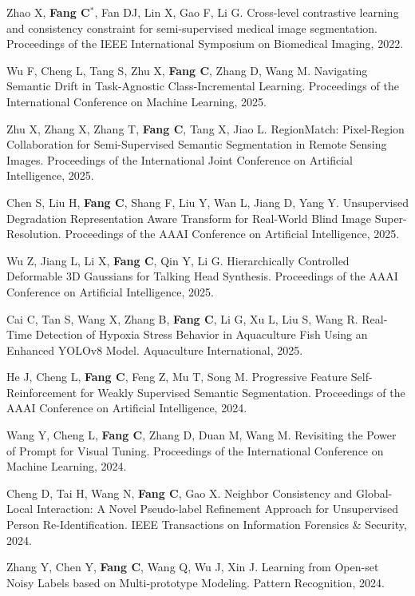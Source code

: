 \documentclass[a4paper,36pt]{article}
\newcommand{\tb}[1]{\textbf{#1}}
\newcommand{\resumeItemWithoutTitle}[1]{
  \item\justifying\small{
    {#1 \vspace{-2pt}}
  }
}
\begin{document}
\resumeItemWithoutTitle{Zhao X, \tb{Fang C}$^{\ast}$, Fan DJ, Lin X, Gao F, Li G. Cross-level contrastive learning and consistency constraint for semi-supervised medical image segmentation. Proceedings of the IEEE International Symposium on Biomedical Imaging, 2022.}

\resumeItemWithoutTitle{Wu F, Cheng L, Tang S, Zhu X, \tb{Fang C}, Zhang D, Wang M. Navigating Semantic Drift in Task-Agnostic Class-Incremental Learning. Proceedings of the International Conference on Machine Learning, 2025.}

\resumeItemWithoutTitle{Zhu X, Zhang X, Zhang T, \tb{Fang C}, Tang X, Jiao L. RegionMatch: Pixel-Region Collaboration for Semi-Supervised Semantic Segmentation in Remote Sensing Images. Proceedings of the International Joint Conference on Artificial Intelligence, 2025.}

\resumeItemWithoutTitle{Chen S, Liu H, \tb{Fang C}, Shang F, Liu Y, Wan L, Jiang D, Yang Y. Unsupervised Degradation Representation Aware Transform for Real-World Blind Image Super-Resolution. Proceedings of the AAAI Conference on Artificial Intelligence, 2025.}

\resumeItemWithoutTitle{Wu Z, Jiang L, Li X, \tb{Fang C}, Qin Y, Li G. Hierarchically Controlled Deformable 3D Gaussians for Talking Head Synthesis. Proceedings of the AAAI Conference on Artificial Intelligence, 2025.}

\resumeItemWithoutTitle{Cai C, Tan S, Wang X, Zhang B, \tb{Fang C}, Li G, Xu L, Liu S, Wang R. Real-Time Detection of Hypoxia Stress Behavior in Aquaculture Fish Using an Enhanced YOLOv8 Model. Aquaculture International, 2025.}

\resumeItemWithoutTitle{He J, Cheng L, \tb{Fang C}, Feng Z, Mu T, Song M. Progressive Feature Self-Reinforcement for Weakly Supervised Semantic Segmentation. Proceedings of the AAAI Conference on Artificial Intelligence, 2024. }

\resumeItemWithoutTitle{Wang Y, Cheng L, \tb{Fang C}, Zhang D, Duan M, Wang M. Revisiting the Power of Prompt for Visual Tuning. Proceedings of the International Conference on Machine Learning, 2024. }

\resumeItemWithoutTitle{Cheng D, Tai H, Wang N, \tb{Fang C}, Gao X. Neighbor Consistency and Global-Local Interaction: A Novel Pseudo-label Refinement Approach for Unsupervised Person Re-Identification. IEEE Transactions on Information Forensics \& Security, 2024.}

\resumeItemWithoutTitle{Zhang Y, Chen Y, \tb{Fang C}, Wang Q, Wu J, Xin J. Learning from Open-set Noisy Labels based on Multi-prototype Modeling. Pattern Recognition, 2024.}
\end{document}
